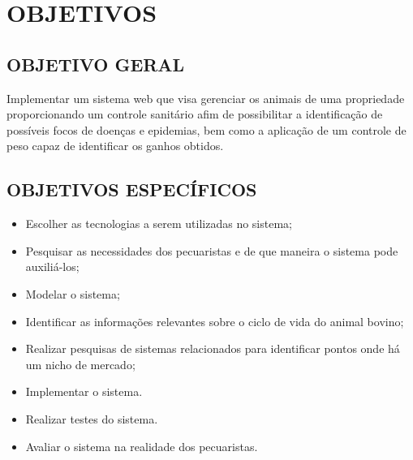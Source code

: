 %
%



\section{OBJETIVOS}

\subsection{OBJETIVO GERAL}

Implementar um sistema web que visa gerenciar os animais de uma propriedade proporcionando um controle sanitário afim de possibilitar a identificação de possíveis focos de doenças e epidemias, bem como a aplicação de um controle de peso capaz de identificar os ganhos obtidos.

\subsection{OBJETIVOS ESPECÍFICOS}

\begin{itemize}
	\item Escolher as tecnologias a serem utilizadas no sistema;
	\item Pesquisar as necessidades dos pecuaristas e de que maneira o sistema pode auxiliá-los;
	\item Modelar o sistema;
	\item Identificar as informações relevantes sobre o ciclo de vida do animal bovino;
	\item Realizar pesquisas de sistemas relacionados para identificar pontos onde há um nicho de mercado;
	\item Implementar o sistema.
	\item Realizar testes do sistema.
	\item Avaliar o sistema na realidade dos pecuaristas.
\end{itemize}
